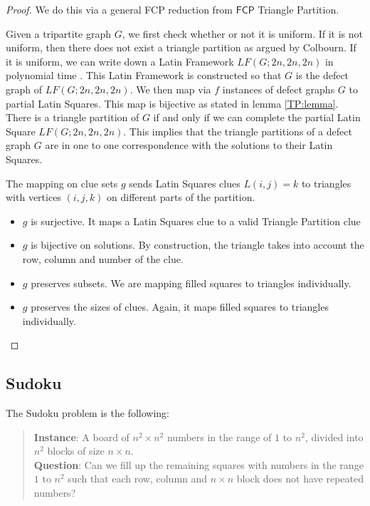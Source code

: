 \documentclass[runningheads,a4paper]{llncs}
\begin{document}
\begin{proof}
We do this via a general FCP reduction from $\mathsf{FCP}$ Triangle Partition.

Given a tripartite graph $G$, we first check whether or not it is uniform. If it is not uniform, then there does not exist a triangle partition as argued by Colbourn. If it is uniform, we can write down a Latin Framework $LF(G;2n,2n,2n)$ in polynomial time \cite{colbourn1984complexity}. This Latin Framework is constructed so that $G$ is the defect graph of $LF(G;2n,2n,2n)$. We then map via $f$ instances of defect graphs $G$ to partial Latin Squares. This map is bijective as stated in lemma \ref{TP:lemma}. There is a triangle partition of $G$ if and only if we can complete the partial Latin Square $LF(G;2n,2n,2n)$. This implies that the triangle partitions of a defect graph $G$ are in one to one correspondence with the solutions to their Latin Squares. 

The mapping on clue sets $g$ sends Latin Squares clues $L(i,j) = k$ to triangles with vertices $(i,j,k)$ on different parts of the partition. 
\begin{itemize}
	\item $g$ is surjective. It maps a Latin Squares clue to a valid Triangle Partition clue
	\item $g$ is bijective on solutions. By construction, the triangle takes into account the row, column and number of the clue.
	\item $g$ preserves subsets. We are mapping filled squares to triangles individually.
	\item $g$ preserves the sizes of clues. Again, it maps filled squares to triangles individually. 
\end{itemize}

\end{proof}

\subsection{Sudoku}

The Sudoku problem is the following: 

\begin{quote}
\textbf{Instance}: A board of $n^2 \times n^2$ numbers in the range of $1$ to $n^2$, divided into $n^2$ blocks of size $n \times n$.\\
\textbf{Question}: Can we fill up the remaining squares with numbers in the range $1$ to $n^2$ such that each row, column and $n \times n$ block does not have repeated numbers?
\end{quote}
\end{document}
